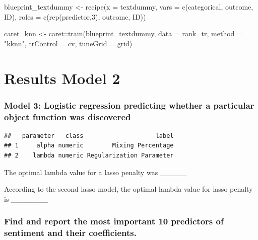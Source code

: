 \documentclass[
  english,
  man]{apa6}
\newenvironment{Shaded}{\begin{snugshade}}{\end{snugshade}}
\newcommand{\AttributeTok}[1]{\textcolor[rgb]{0.77,0.63,0.00}{#1}}
\newcommand{\DecValTok}[1]{\textcolor[rgb]{0.00,0.00,0.81}{#1}}
\newcommand{\FunctionTok}[1]{\textcolor[rgb]{0.00,0.00,0.00}{#1}}
\newcommand{\NormalTok}[1]{#1}
\newcommand{\OtherTok}[1]{\textcolor[rgb]{0.56,0.35,0.01}{#1}}
\newcommand{\SpecialCharTok}[1]{\textcolor[rgb]{0.00,0.00,0.00}{#1}}
\newcommand{\StringTok}[1]{\textcolor[rgb]{0.31,0.60,0.02}{#1}}
\begin{document}
\begin{Shaded}
\begin{Highlighting}[]
\NormalTok{blueprint\_textdummy }\OtherTok{\textless{}{-}} \FunctionTok{recipe}\NormalTok{(}\AttributeTok{x  =}\NormalTok{ textdummy,}
                    \AttributeTok{vars  =} \FunctionTok{c}\NormalTok{(categorical, outcome, ID),}
                    \AttributeTok{roles =} \FunctionTok{c}\NormalTok{(}\FunctionTok{rep}\NormalTok{(}\StringTok{\textquotesingle{}predictor\textquotesingle{}}\NormalTok{,}\DecValTok{3}\NormalTok{), }\StringTok{\textquotesingle{}outcome\textquotesingle{}}\NormalTok{, }\StringTok{\textquotesingle{}ID\textquotesingle{}}\NormalTok{)) }


\NormalTok{  caret\_knn }\OtherTok{\textless{}{-}}\NormalTok{ caret}\SpecialCharTok{::}\FunctionTok{train}\NormalTok{(blueprint\_textdummy, }
                                        \AttributeTok{data      =}\NormalTok{ rank\_tr,}
                                        \AttributeTok{method    =} \StringTok{"kknn"}\NormalTok{,}
                                        \AttributeTok{trControl =}\NormalTok{ cv,}
                                        \AttributeTok{tuneGrid  =}\NormalTok{ grid)}
\end{Highlighting}
\end{Shaded}

\hypertarget{results-model-2}{%
\section{Results Model 2}\label{results-model-2}}

\hypertarget{model-3-logistic-regression-predicting-whether-a-particular-object-function-was-discovered}{%
\subsubsection{Model 3: Logistic regression predicting whether a particular object function was discovered}\label{model-3-logistic-regression-predicting-whether-a-particular-object-function-was-discovered}}

\begin{verbatim}
##   parameter   class                    label
## 1     alpha numeric        Mixing Percentage
## 2    lambda numeric Regularization Parameter
\end{verbatim}

The optimal lambda value for a lasso penalty was \_\_\_\_\_

According to the second lasso model, the optimal lambda value for lasso penalty is \_\_\_\_\_\_\_

\hypertarget{find-and-report-the-most-important-10-predictors-of-sentiment-and-their-coefficients.}{%
\subsubsection{Find and report the most important 10 predictors of sentiment and their coefficients.}\label{find-and-report-the-most-important-10-predictors-of-sentiment-and-their-coefficients.}}
\end{document}

